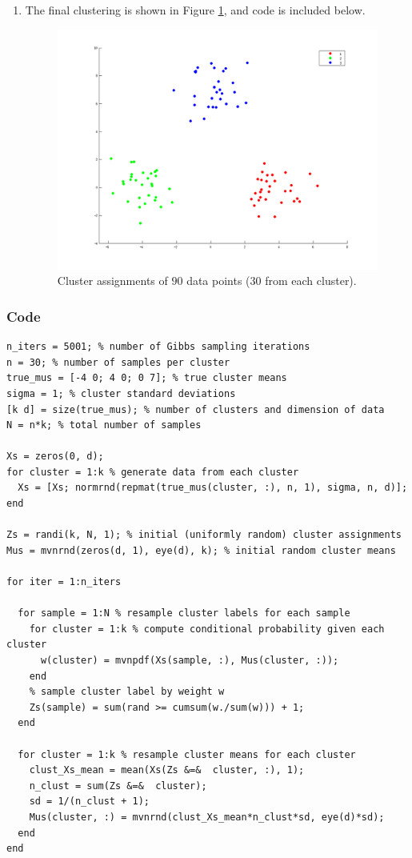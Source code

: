 \documentclass[11pt]{article}
\begin{document}
\begin{enumerate}
\begin{enumerate}
\item The final clustering is shown in Figure \ref{fig:432b}, and code
is included below.
\begin{figure}[h!]
\centering
\quad\;
\includegraphics[trim=18mm 0mm 18mm 0mm, clip=true, width=0.65\linewidth]{432b}
\vspace{-6mm}
\caption{Cluster assignments of $90$ data points ($30$ from each cluster).}
\label{fig:432b}
\end{figure}
\end{enumerate}
\end{enumerate}
\subsubsection*{Code}
\begin{verbatim}
n_iters = 5001; % number of Gibbs sampling iterations
n = 30; % number of samples per cluster
true_mus = [-4 0; 4 0; 0 7]; % true cluster means
sigma = 1; % cluster standard deviations
[k d] = size(true_mus); % number of clusters and dimension of data
N = n*k; % total number of samples

Xs = zeros(0, d);
for cluster = 1:k % generate data from each cluster
  Xs = [Xs; normrnd(repmat(true_mus(cluster, :), n, 1), sigma, n, d)];
end

Zs = randi(k, N, 1); % initial (uniformly random) cluster assignments
Mus = mvnrnd(zeros(d, 1), eye(d), k); % initial random cluster means

for iter = 1:n_iters

  for sample = 1:N % resample cluster labels for each sample
    for cluster = 1:k % compute conditional probability given each cluster
      w(cluster) = mvnpdf(Xs(sample, :), Mus(cluster, :));
    end
    % sample cluster label by weight w
    Zs(sample) = sum(rand >= cumsum(w./sum(w))) + 1;
  end

  for cluster = 1:k % resample cluster means for each cluster
    clust_Xs_mean = mean(Xs(Zs &=&  cluster, :), 1);
    n_clust = sum(Zs &=&  cluster);
    sd = 1/(n_clust + 1);
    Mus(cluster, :) = mvnrnd(clust_Xs_mean*n_clust*sd, eye(d)*sd);
  end
end
\end{verbatim}
\end{document}
